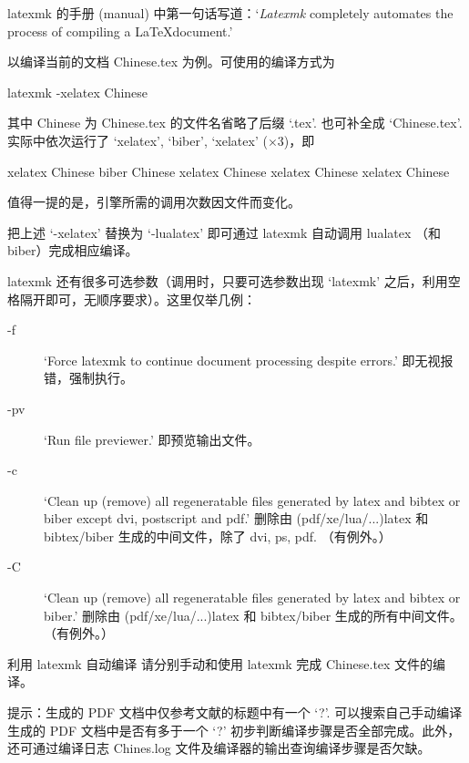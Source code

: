 latexmk 的手册 (manual)\cite{latexmk} 中第一句话写道：`\emph{Latexmk} completely automates the process of compiling a \LaTeX document.'

以编译当前的文档 Chinese.tex 为例。可使用的编译方式为
\begin{bashlst}
latexmk -xelatex Chinese
\end{bashlst}
其中 Chinese 为 Chinese.tex 的文件名省略了后缀 `.tex'. 也可补全成 `Chinese.tex'. 实际中依次运行了 `xelatex', `biber', `xelatex' ($\times 3$)，即
\begin{bashlst}[numbers=left]
xelatex Chinese
biber Chinese
xelatex Chinese
xelatex Chinese
xelatex Chinese
\end{bashlst}
值得一提的是，引擎所需的调用次数因文件而变化。

把上述 `-xelatex' 替换为 `-lualatex' 即可通过 latexmk 自动调用 lualatex （和 biber）完成相应编译。

latexmk 还有很多可选参数（调用时，只要可选参数出现 `latexmk' 之后，利用空格隔开即可，无顺序要求）。这里仅举几例：
\begin{description}
\item[-f] `Force latexmk to continue document processing despite errors.' 即无视报错，强制执行。
\item[-pv] `Run file previewer.' 即预览输出文件。
\item[-c] `Clean up (remove) all regeneratable files generated by latex and bibtex or biber except dvi, postscript and pdf.' 删除由 (pdf/xe/lua/...)latex 和 bibtex/biber 生成的中间文件，除了 dvi, ps, pdf. （有例外。）
\item[-C] `Clean up (remove) all regeneratable files generated by latex and bibtex or biber.' 删除由 (pdf/xe/lua/...)latex 和 bibtex/biber 生成的所有中间文件。（有例外。）
\end{description}

\begin{Ex}{利用 latexmk 自动编译}
请分别手动和使用 latexmk 完成 Chinese.tex 文件的编译。

提示：生成的 PDF 文档中仅参考文献的标题中有一个 `?'. 可以搜索自己手动编译生成的 PDF 文档中是否有多于一个 `?' 初步判断编译步骤是否全部完成。此外，还可通过编译日志 Chines.log 文件及编译器的输出查询编译步骤是否欠缺。
\end{Ex}